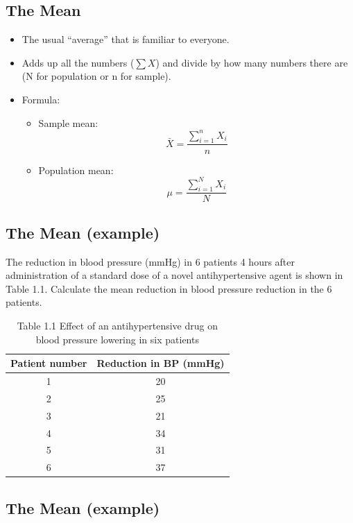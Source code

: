 \documentclass[]{article}
\providecommand{\tightlist}{%
  \setlength{\itemsep}{0pt}\setlength{\parskip}{0pt}}
\begin{document}
\hypertarget{the-mean}{%
\subsection{The Mean}\label{the-mean}}

\begin{itemize}
\tightlist
\item
  The usual ``average'' that is familiar to everyone.
\item
  Adds up all the numbers (\(\sum{X}\)) and divide by how many numbers
  there are (N for population or n for sample).
\item
  Formula:

  \begin{itemize}
  \tightlist
  \item
    Sample mean: \[\bar{X}=\frac{\sum_{i=1}^n X_i}{n}\]
  \item
    Population mean: \[\mu=\frac{\sum_{i=1}^N X_i}{N}\]
  \end{itemize}
\end{itemize}

\hypertarget{the-mean-example}{%
\subsection{The Mean (example)}\label{the-mean-example}}

The reduction in blood pressure (mmHg) in 6 patients 4 hours after
administration of a standard dose of a novel antihypertensive agent is
shown in Table 1.1. Calculate the mean reduction in blood pressure
reduction in the 6 patients.

\begin{table}

\caption{\label{tab:unnamed-chunk-10}Table 1.1 Effect of an antihypertensive drug on blood pressure lowering in six patients}
\centering
\fontsize{20}{22}\selectfont
\begin{tabular}[t]{c|c}
\hline
Patient number & Reduction in BP (mmHg)\\
\hline
1 & 20\\
\hline
2 & 25\\
\hline
3 & 21\\
\hline
4 & 34\\
\hline
5 & 31\\
\hline
6 & 37\\
\hline
\end{tabular}
\end{table}

\hypertarget{the-mean-example-1}{%
\subsection{The Mean (example)}\label{the-mean-example-1}}
\end{document}
